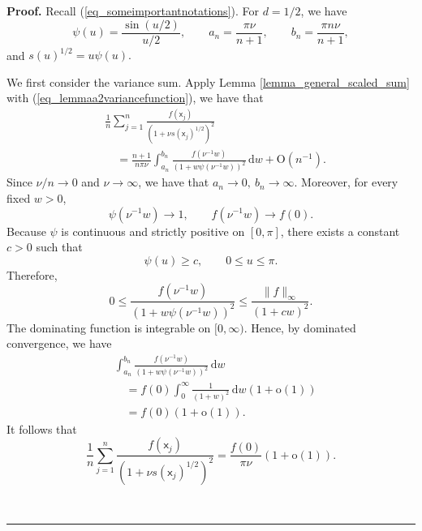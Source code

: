 \documentclass[11pt]{article}
\newcommand{\sfx}{\mathsf{x}}
\newenvironment{proof}[1][Proof]{\noindent\textbf{#1.} }{\ \rule{0.5em}{0.5em}}
\numberwithin{equation}{section}
\numberwithin{figure}{section}
\begin{document}
\begin{proof}
Recall (\ref{eq_someimportantnotations}).
For \(d=1/2\), we have 
\begin{equation*}
\psi(u)=\frac{\sin(u/2)}{u/2},
\qquad
a_n=\frac{\pi\nu}{n+1},
\qquad
b_n=\frac{\pi n\nu}{n+1},
\end{equation*}
and $s(u)^{1/2}=u\psi(u).$

We first consider the variance sum. Apply Lemma
\ref{lemma_general_scaled_sum} with (\ref{eq_lemmaa2variancefunction}), we have that 
\begin{equation*}
\begin{aligned}
&\frac{1}{n}\sum_{j=1}^n
\frac{f(\sfx_j)}
{(1+\nu s(\sfx_j)^{1/2})^2} \\
&\quad=
\frac{n+1}{n\pi\nu}
\int_{a_n}^{b_n}
\frac{f(\nu^{-1}w)}
{(1+w\psi(\nu^{-1}w))^2}
\,\mathrm{d}w
+\mathrm{O}(n^{-1}).
\end{aligned}
\end{equation*}
Since \(\nu/n\to0\) and \(\nu\to\infty\), we have that $a_n\longrightarrow0, \ b_n\longrightarrow\infty.$ Moreover, for every fixed \(w>0\),
\begin{equation*}
\psi(\nu^{-1}w)\longrightarrow1,
\qquad
f(\nu^{-1}w)\longrightarrow f(0).
\end{equation*}
Because \(\psi\) is continuous and strictly positive on \([0,\pi]\), there
exists a constant \(c>0\) such that
\begin{equation*}
\psi(u)\geq c,
\qquad
0\leq u\leq\pi.
\end{equation*}
Therefore,
\begin{equation*}
0\leq
\frac{f(\nu^{-1}w)}
{(1+w\psi(\nu^{-1}w))^2}
\leq
\frac{\|f\|_\infty}{(1+cw)^2}.
\end{equation*}
The dominating function is integrable on \([0,\infty)\). Hence, by dominated
convergence, we have
\begin{equation}\label{eq_exampleone}
\begin{aligned}
&\int_{a_n}^{b_n}
\frac{f(\nu^{-1}w)}
{(1+w\psi(\nu^{-1}w))^2}
\,\mathrm{d}w \\
&\quad=
f(0)\int_0^\infty\frac{1}{(1+w)^2}\,\mathrm{d}w
(1+\mathrm{o}(1)) \\
&\quad=
f(0)(1+\mathrm{o}(1)).
\end{aligned}
\end{equation}
It follows that
\begin{equation*}
\frac{1}{n}\sum_{j=1}^n
\frac{f(\sfx_j)}
{(1+\nu s(\sfx_j)^{1/2})^2}
=
\frac{f(0)}{\pi\nu}(1+\mathrm{o}(1)).
\end{equation*}


\end{proof}
\end{document}
